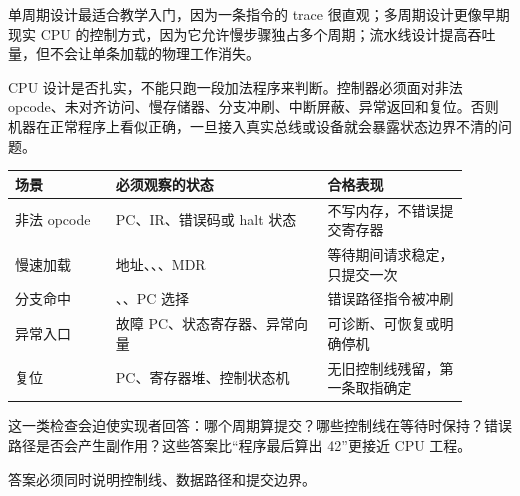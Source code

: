 单周期设计最适合教学入门，因为一条指令的 trace 很直观；多周期设计更像早期现实 CPU 的控制方式，因为它允许慢步骤独占多个周期；流水线设计提高吞吐量，但不会让单条加载的物理工作消失。

CPU 设计是否扎实，不能只跑一段加法程序来判断。控制器必须面对非法 opcode、未对齐访问、慢存储器、分支冲刷、中断屏蔽、异常返回和复位。否则机器在正常程序上看似正确，一旦接入真实总线或设备就会暴露状态边界不清的问题。

\begin{longtable}{L{0.2\linewidth}L{0.42\linewidth}L{0.28\linewidth}}
\toprule
场景 & 必须观察的状态 & 合格表现 \\
\midrule
非法 opcode & PC、IR、错误码或 halt 状态 & 不写内存，不错误提交寄存器 \\\tablerowrule
慢速加载 & 地址、、、MDR & 等待期间请求稳定，只提交一次 \\\tablerowrule
分支命中 & 、、PC 选择 & 错误路径指令被冲刷 \\\tablerowrule
异常入口 & 故障 PC、状态寄存器、异常向量 & 可诊断、可恢复或明确停机 \\\tablerowrule
复位 & PC、寄存器堆、控制状态机 & 无旧控制线残留，第一条取指确定 \\
\bottomrule
\end{longtable}

这一类检查会迫使实现者回答：哪个周期算提交？哪些控制线在等待时保持？错误路径是否会产生副作用？这些答案比“程序最后算出 42”更接近 CPU 工程。





答案必须同时说明控制线、数据路径和提交边界。



































































